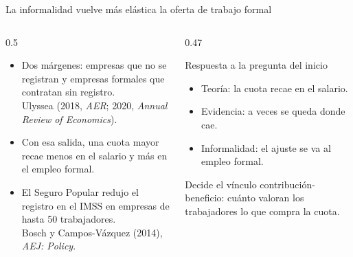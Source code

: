 \documentclass[aspectratio=169,11pt]{beamer}
\begin{document}
\begin{frame}{La informalidad vuelve más elástica la oferta de trabajo formal}
  \begin{columns}[T]
    \begin{column}{0.5\textwidth}
      \begin{itemize}
        \item Dos márgenes: empresas que no se registran y empresas formales que contratan sin registro.\\
          {\small\color{cGris}Ulyssea (2018, \emph{AER}; 2020, \emph{Annual Review of Economics}).}
        \item Con esa salida, una cuota mayor recae menos en el salario y más en el empleo formal.
        \item El Seguro Popular redujo el registro en el IMSS en empresas de hasta 50 trabajadores.\\
          {\small\color{cGris}Bosch y Campos-Vázquez (2014), \emph{AEJ: Policy}.}
      \end{itemize}
    \end{column}
    \begin{column}{0.47\textwidth}
      \pause
      \begin{block}{Respuesta a la pregunta del inicio}
        \begin{itemize}
          \item Teoría: la cuota recae en el salario.
          \item Evidencia: a veces se queda donde cae.
          \item Informalidad: el ajuste se va al empleo formal.
        \end{itemize}
        Decide el vínculo contribución-beneficio: cuánto valoran los trabajadores lo que compra la cuota.
      \end{block}
    \end{column}
  \end{columns}
\end{frame}
\end{document}
